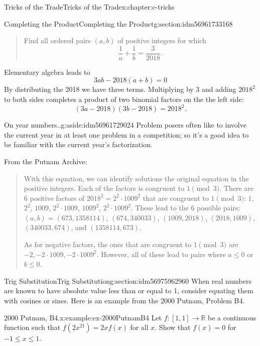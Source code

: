 \documentclass[twoside,10pt,]{book}
\numberwithin{equation}{section}
\begin{document}
\begin{chapterptx}{Tricks of the Trade}{}{Tricks of the Trade}{}{}{x:chapter:c-tricks}
\begin{sectionptx}{Completing the Product}{}{Completing the Product}{}{}{g:section:idm56961733168}
\begin{quote}
Find all ordered pairs \((a,b)\) of positive integers for which%
\begin{equation*}
\frac{1}{a} + \frac{1}{b} = \frac{3}{2018}.
\end{equation*}
%
\end{quote}
Elementary algebra leads to%
\begin{equation*}
3ab-2018(a+b)=0
\end{equation*}
By distributing the 2018 we have three terms.  Multiplying by 3 and adding \(2018^2\) to both sides completes a product of two binomial factors on the the left side:%
\begin{equation*}
(3a-2018)(3b-2018) = 2018^2.
\end{equation*}
%
\begin{aside}{On year numbers..}{g:aside:idm56961729024}%
Problem posers often like to involve the current year in at least one problem in a competition; so it's a good idea to be familiar with the current year's factorization.%
\end{aside}
From the Putnam Archive:%
\begin{quote}%
With this equation, we can identify solutions the original equation in the positive integers. Each of the factors is congruent to \(1 \pmod 3\). There are \(6\) positive factors of \(2018^2 = 2^2 \cdot 1009^2\) that are congruent to \(1 \pmod 3\): \(1\), \(2^2\), \(1009\), \(2^2 \cdot 1009\), \(1009^2\), \(2^2 \cdot 1009^2\). These lead to the \(6\) possible pairs: \((a,b) = (673,1358114)\), \((674,340033)\), \((1009,2018)\), \((2018,1009)\), \((340033,674)\), and \((1358114,673)\).%
\par
As for negative factors, the ones that are congruent to \(1 \pmod 3\) are \(-2, -2 \cdot 1009, -2 \cdot 1009^2\).  However, all of these lead to pairs where \(a \leq 0\) or \(b \leq 0\).%
\end{quote}
\end{sectionptx}
%
%
\typeout{************************************************}
\typeout{************************************************}
%
\begin{sectionptx}{Trig Substitution}{}{Trig Substitution}{}{}{g:section:idm56975962960}
When real numbers are known to have absolute value less than or equal to 1, consider equating them with cosines or sines.   Here is an example from the 2000 Putnam, Problem B4.%
\begin{example}{2000 Putnam, B4.}{x:example:ex-2000PutnamB4}%
Let \(f:[1,1]\rightarrow \mathbb{R}\) be a continuous function such that \(f(2x^21)=2xf(x)\) for all \(x\). Show that \(f(x)=0\) for \(-1 \leq x \leq 1\).%

\end{example}
\end{sectionptx}
\end{chapterptx}
\end{document}
